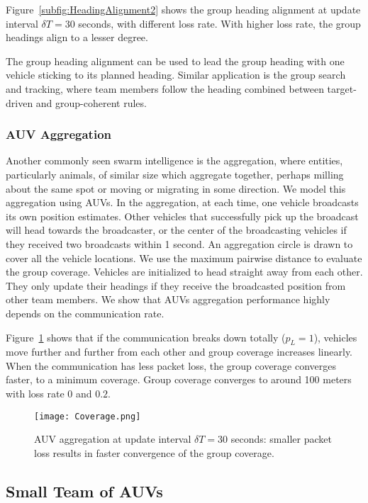 Figure~\ref{subfig:HeadingAlignment2} shows the group heading alignment at update interval $\delta T=30$ seconds, with different loss rate. With higher loss rate, the group headings align to a lesser degree.

The group heading alignment can be used to lead the group heading with one vehicle sticking to its planned heading. Similar application is the group search and tracking, where team members follow the heading combined between target-driven and group-coherent rules.

\subsubsection{AUV Aggregation}

Another commonly seen swarm intelligence is the aggregation, where entities, particularly animals, of similar size which aggregate together, perhaps milling about the same spot or moving or migrating in some direction. We model this aggregation using AUVs. In the aggregation, at each time, one vehicle broadcasts its own position estimates. Other vehicles that successfully pick up the broadcast will head towards the broadcaster, or the center of the broadcasting vehicles if they received two broadcasts within 1 second. An aggregation circle is drawn to cover all the vehicle locations. We use the maximum pairwise distance to evaluate the group coverage. Vehicles are initialized to head straight away from each other. They only update their headings if they receive the broadcasted position from other team members. We show that AUVs aggregation performance highly depends on the communication rate.

Figure~\ref{fig:coverage} shows that if the communication breaks down totally ($p_L=1$), vehicles move further and further from each other and group coverage increases linearly. When the communication has less packet loss, the group coverage converges faster, to a minimum coverage. Group coverage converges to around 100 meters with loss rate $0$ and $0.2$.  


\begin{figure}[htbp]
\centering
\texttt{[image: Coverage.png]}
\caption{AUV aggregation at update interval $\delta T=30$ seconds: smaller packet loss results in faster convergence of the group coverage.}
\label{fig:coverage}
\end{figure}

\subsection{Small Team of AUVs}


